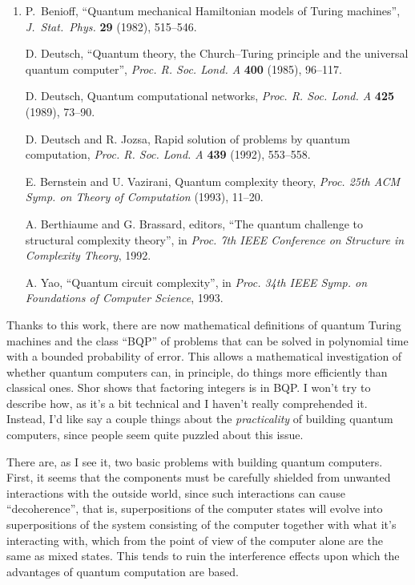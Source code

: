 \documentclass{article}
\begin{document}
\begin{enumerate}
\def\labelenumi{\arabic{enumi})}
\setcounter{enumi}{2}
\item
    P.\  Benioff,
  ``Quantum mechanical Hamiltonian models of Turing machines'', \emph{J.\ Stat.\ Phys.} 
   \textbf{29} (1982), 515--546.

  D. Deutsch, ``Quantum theory, the Church--Turing principle and the universal
  quantum computer'',  \emph{Proc. R. Soc. Lond. A}
  \textbf{400} (1985), 96--117.

  D. Deutsch, Quantum computational networks, \emph{Proc. R. Soc.
  Lond. A} \textbf{425} (1989), 73--90.

  D. Deutsch and R. Jozsa, Rapid solution of problems by quantum computation, 
  \emph{Proc. R. Soc. Lond. A } \textbf{439} (1992), 553--558.

  E. Bernstein and U. Vazirani, Quantum complexity theory, \emph{Proc.
  25th ACM Symp. on Theory of Computation} (1993), 11--20.

   A. Berthiaume and G. Brassard, editors, ``The quantum challenge to structural complexity theory'', 
   in  \emph{Proc. 7th IEEE Conference on
  Structure in Complexity Theory}, 1992.

   A. Yao, ``Quantum circuit complexity'', in \emph{Proc. 34th IEEE Symp.
  on Foundations of Computer Science}, 1993.
\end{enumerate}
\noindent
Thanks to this work, there are now mathematical definitions of quantum
Turing machines and the class ``BQP'' of problems that can be solved in
polynomial time with a bounded probability of error. This allows a
mathematical investigation of whether quantum computers can, in
principle, do things more efficiently than classical ones. Shor shows
that factoring integers is in BQP. I won't try to describe how, as it's
a bit technical and I haven't really comprehended it. Instead, I'd like
say a couple things about the \emph{practicality} of building quantum
computers, since people seem quite puzzled about this issue.

There are, as I see it, two basic problems with building quantum
computers. First, it seems that the components must be carefully
shielded from unwanted interactions with the outside world, since such
interactions can cause ``decoherence'', that is, superpositions of the
computer states will evolve into superpositions of the system consisting
of the computer together with what it's interacting with, which from the
point of view of the computer alone are the same as mixed states. This
tends to ruin the interference effects upon which the advantages of
quantum computation are based.
\end{document}
